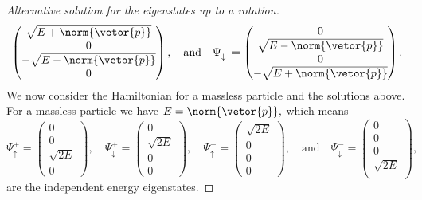 \begin{proof}[Alternative solution for the eigenstates up to a rotation]
\begin{equation*}
\begin{pmatrix}
         \sqrt{E + \norm{\vetor{p}}}\\
         0\\
         -\sqrt{E - \norm{\vetor{p}}}\\
         0
      \end{pmatrix},\quad\text{and}\quad
      \Psi^-_\downarrow = \begin{pmatrix}
         0\\
         \sqrt{E - \norm{\vetor{p}}}\\
         0\\
         -\sqrt{E + \norm{\vetor{p}}}
      \end{pmatrix}.
   \end{equation*}
   We now consider the Hamiltonian for a massless particle and the solutions above. For a massless particle we have \(E = \norm{\vetor{p}},\) which means
   \begin{equation*}
      \Psi^+_\uparrow = \begin{pmatrix}
         0\\
         0\\
         \sqrt{2E}\\
         0
      \end{pmatrix},\quad
      \Psi^+_\downarrow = \begin{pmatrix}
         0\\
         \sqrt{2E}\\
         0\\
         0
      \end{pmatrix},\quad
      \Psi^-_\uparrow = \begin{pmatrix}
         \sqrt{2E}\\
         0\\
         0\\
         0
      \end{pmatrix},\quad\text{and}\quad
      \Psi^-_\downarrow = \begin{pmatrix}
         0\\
         0\\
         0\\
         \sqrt{2E}\\
      \end{pmatrix},
   \end{equation*}
   are the independent energy eigenstates.
\end{proof}

